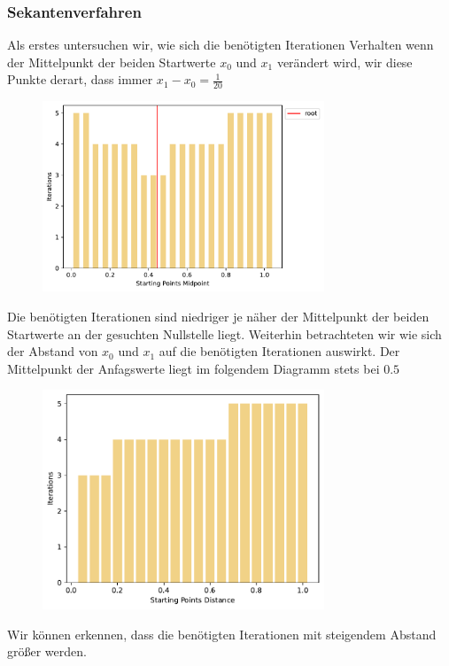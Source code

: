 \documentclass[a4paper,12pt]{article}
\newcommand{\1}{1\hspace{-0,9ex}1}
\begin{document}
\subsubsection*{Sekantenverfahren}
Als erstes untersuchen wir, wie sich die benötigten Iterationen Verhalten wenn der Mittelpunkt der beiden Startwerte $x_0$ und $x_1$ verändert wird, wir diese Punkte derart, dass immer $x_1-x_0=\frac{1}{20}$
\begin{figure}[H]
	\centering
	\includegraphics[width=0.75\textwidth]{plots/secant_iterations_by_midpoint_of_starting_points.pdf}
\end{figure}
Die benötigten Iterationen sind niedriger je näher der Mittelpunkt der beiden Startwerte an der gesuchten Nullstelle liegt.
Weiterhin betrachteten wir wie sich der Abstand von $x_0$ und $x_1$ auf die benötigten Iterationen auswirkt. Der Mittelpunkt der Anfagswerte liegt im folgendem Diagramm stets bei $0.5$
\begin{figure}[H]
	\centering
	\includegraphics[width=0.75\textwidth]{plots/secant_iterations_by_starting_points_distance.pdf}
\end{figure}
Wir können erkennen, dass die benötigten Iterationen mit steigendem Abstand größer werden.
\end{document}
